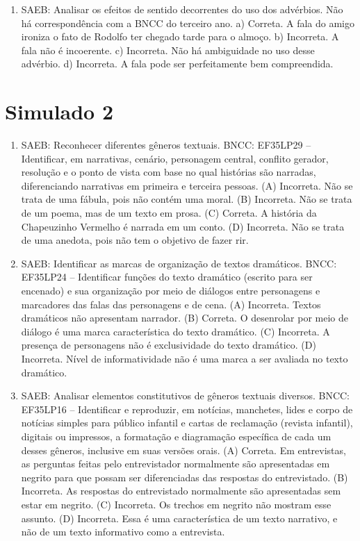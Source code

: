 \begin{enumerate}
\item
SAEB: Analisar os efeitos de sentido decorrentes do uso dos advérbios. Não há correspondência com a BNCC do terceiro ano. a) Correta. A fala do amigo ironiza o fato de Rodolfo ter chegado tarde para o almoço. b) Incorreta. A fala não é incoerente. c) Incorreta. Não há ambiguidade no uso desse advérbio. d) Incorreta. A fala pode ser perfeitamente bem compreendida.
\end{enumerate}

\section*{Simulado 2}

\begin{enumerate}
\item
SAEB: Reconhecer diferentes gêneros textuais.
BNCC: EF35LP29 -- Identificar, em narrativas, cenário, personagem central,
conflito gerador, resolução e o ponto de vista com base no qual
histórias são narradas, diferenciando narrativas em primeira e terceira
pessoas.
(A) Incorreta. Não se trata de uma fábula, pois não contém uma moral.
(B) Incorreta. Não se trata de um poema, mas de um texto em prosa.
(C) Correta. A história da Chapeuzinho Vermelho é narrada em um conto.
(D) Incorreta. Não se trata de uma anedota, pois não tem o objetivo de fazer rir.

\item
SAEB: Identificar as marcas de organização de textos dramáticos.
BNCC: EF35LP24 -- Identificar funções do texto dramático (escrito para ser encenado) e sua organização
por meio de diálogos entre personagens e marcadores das falas das personagens e de cena.
(A) Incorreta. Textos dramáticos não apresentam narrador.
(B) Correta. O desenrolar por meio de diálogo é uma marca característica do texto dramático.
(C) Incorreta. A presença de personagens não é exclusividade do texto dramático.
(D) Incorreta. Nível de informatividade não é uma marca a ser avaliada no texto dramático.

\item
SAEB: Analisar elementos constitutivos de gêneros textuais diversos.
BNCC: EF35LP16 -- Identificar e reproduzir, em notícias, manchetes, lides e
corpo de notícias simples para público infantil e cartas de reclamação
(revista infantil), digitais ou impressos, a formatação e diagramação
específica de cada um desses gêneros, inclusive em suas versões orais.
(A) Correta. Em entrevistas, as perguntas feitas pelo entrevistador
normalmente são apresentadas em negrito para que possam ser
diferenciadas das respostas do entrevistado.
(B) Incorreta. As respostas do entrevistado normalmente são apresentadas
sem estar em negrito.
(C) Incorreta. Os trechos em negrito não mostram esse assunto.
(D) Incorreta. Essa é uma característica de um texto narrativo, e não de
um texto informativo como a entrevista.


\end{enumerate}
